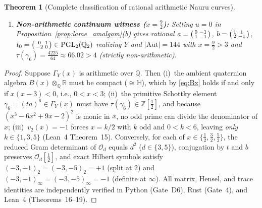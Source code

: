 \documentclass[11pt]{amsart}
\numberwithin{equation}{section}
\theoremstyle{plain}
\newtheorem{theorem}{Theorem}[section]
\theoremstyle{definition}\newtheorem{definition}[theorem]{Definition}
\theoremstyle{remark}\newtheorem{remark}[theorem]{Remark}
\newcommand{\Q}{\mathbb{Q}}
\newcommand{\R}{\mathbb{R}}
\newcommand{\Z}{\mathbb{Z}}
\renewcommand{\H}{\mathbb{H}}
\newcommand{\calO}{\mathcal{O}}
\newcommand{\PGL}{\mathrm{PGL}}
\newcommand{\Aut}{\mathrm{Aut}}
\begin{document}
\begin{theorem}[Complete classification of rational arithmetic Nauru curves]
\begin{enumerate}[label=(\alph*),nosep]
\item \textbf{Non-arithmetic continuum witness ($x=\tfrac92$):} Setting $u=0$ in Proposition~\ref{prop:lame_amalgam}(b) gives rational $a=\begin{psmallmatrix}0&-1\\1&-1\end{psmallmatrix}$, $b=\begin{psmallmatrix}1&1\\2&-1\end{psmallmatrix}$, $t_0=\begin{psmallmatrix}0&1\\-2&0\end{psmallmatrix}\in\PGL_2(\Q_2)$ realizing $Y$ and $|\Aut|=144$ with $x=\frac92>3$ and $\tau(\gamma_6)=\frac{4225}{64}\approx 66.02>4$ (strictly non-arithmetic).
\end{enumerate}
\end{theorem}
\begin{proof}
Suppose $\Gamma_Y(x)$ is arithmetic over $\Q$. Then (i)~the ambient quaternion algebra $B(x)\otimes_\Q\R$ must be compact ($\cong\H$), which by \eqref{eq:Bx} holds if and only if $x(x-3)<0$, i.e., $0<x<3$; (ii)~the primitive Schottky element $\gamma_6=(ta)^6\in\Gamma_Y(x)$ must have $\tau(\gamma_6)\in\Z[\frac12]$, and because $(x^3-6x^2+9x-2)^2$ is monic in $x$, no odd prime can divide the denominator of $x$; (iii)~$v_2(x)=-1$ forces $x=k/2$ with $k$ odd and $0<k<6$, leaving \emph{only} $k\in\{1,3,5\}$ (Lean~4 Theorem~15). Conversely, for each of $x\in\{\frac12,\frac32,\frac52\}$, the reduced Gram determinant of $\calO_d$ equals $d^2$ ($d\in\{3,5\}$), conjugation by $t$ and $b$ preserves $\calO_d[\frac12]$, and exact Hilbert symbols satisfy $(-3,-1)_2=(-3,-5)_2=+1$ (split at $2$) and $(-3,-1)_\infty=(-3,-5)_\infty=-1$ (definite at $\infty$). All matrix, Hensel, and trace identities are independently verified in Python (Gate~D6), Rust (Gate~4), and Lean~4 (Theorems~16--19).
\end{proof}
\end{document}
